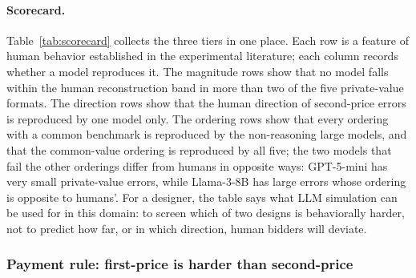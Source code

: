 \documentclass{article} %
\newif\ifmarkrev
\newcommand{\rev}[1]{\ifmarkrev\begingroup\color{red}#1\endgroup\else#1\fi}
\begin{document}
\paragraph{\rev{Scorecard.}}
\rev{Table~\ref{tab:scorecard} collects the three tiers in one place. Each row is a feature of human behavior established in the experimental literature; each column records whether a model reproduces it. The magnitude rows show that no model falls within the human reconstruction band in more than two of the five private-value formats. The direction rows show that the human direction of second-price errors is reproduced by one model only. The ordering rows show that every ordering with a common benchmark is reproduced by the non-reasoning large models, and that the common-value ordering is reproduced by all five; the two models that fail the other orderings differ from humans in opposite ways: GPT-5-mini has very small private-value errors, while Llama-3-8B has large errors whose ordering is opposite to humans'. For a designer, the table says what LLM simulation can be used for in this domain: to screen which of two designs is behaviorally harder, not to predict how far, or in which direction, human bidders will deviate.}

\begin{table}[htbp]
\centering
\small
\rev{\resizebox{\linewidth}{!}{}}
\caption{\rev{\textbf{Scorecard by tier.} Rows are features of human behavior; cells record whether a model reproduces them. Tier 1: SMAD inside (\checkmark) or outside ($\times$) the human 95\% reconstruction band, which the human column reports. Tiers 2 and 3: \checkmark reproduced, $\times$ not reproduced, $\approx$ uninformative because the cells sit at the theoretical benchmark; the human column gives the share of reconstruction re-draws in which the ordering holds where applicable. n/a: fewer than 30 usable bids; $^{a}$: 46 usable bids; DS$^{\ddagger}$: GPT-5-mini states the dominant strategy outright and does not complete the clock procedure, so no clock bids are recorded. The last column counts the non-reasoning large models that reproduce the row, out of those with data.}}
\label{tab:scorecard}
\end{table}

\subsubsection{\texorpdfstring{\rev{Payment rule: first-price is harder than second-price}}{Payment rule: first-price is harder than second-price}}
\end{document}
